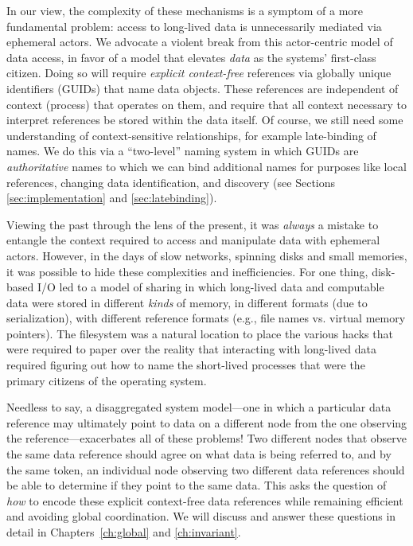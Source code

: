In our view, the complexity of these mechanisms is a symptom of a more fundamental problem: access to long-lived data
is unnecessarily mediated via ephemeral actors.
We advocate a violent break from this actor-centric model of data access, in favor of a model that elevates \emph{data}
as the systems' first-class citizen.  Doing so will require \emph{explicit
    context-free} references via globally unique identifiers (GUIDs) that name data objects. These
references are independent of context (\eg process) that operates on them, and require that all context necessary to interpret references
be stored within the data itself. Of course, we still need some understanding of
context-sensitive relationships, for example late-binding of names. We do this via a
``two-level'' naming system in which GUIDs are \emph{authoritative} names to which we can bind
additional names for purposes like local references, changing data identification, and discovery
(see Sections \ref{sec:implementation} and \ref{sec:latebinding}).

Viewing the past through the lens of the present, it was \emph{always} a mistake to entangle the context required to access
and manipulate data with ephemeral actors.  However, in the days of slow networks, spinning disks and small memories,
it was possible to hide these complexities and inefficiencies.  For one thing, disk-based I/O led to a model of sharing in
which long-lived data and computable data were stored in different \emph{kinds} of memory, in different formats (due to serialization),
with different reference formats (e.g., file names vs. virtual memory pointers).
The filesystem was a natural location to place the various hacks that were required to paper over the reality
that interacting with long-lived data required figuring out how to name the short-lived processes that were the primary
citizens of the operating system.

Needless to say, a disaggregated system model---one in which a particular data reference may
ultimately point to data on a different node from the one observing the reference---exacerbates all of these problems!
Two different nodes that observe the same data reference should agree on what data is
being referred to, and by the same token, an individual node observing two different data references
should be able to determine if they point to the same data. This asks the question of \emph{how}
to encode these explicit context-free data references while remaining efficient and avoiding global
coordination. We will discuss and answer these questions in detail in Chapters~\ref{ch:global} and \ref{ch:invariant}.


